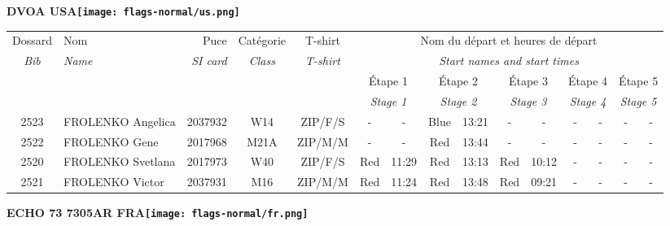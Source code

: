 \documentclass{report}
\begin{document}
\newpage
  \Huge \centering \bfseries DVOA  USA\normalfont \footnotesize \sffamily \hfill \texttt{[image: flags-normal/us.png]} \newline 
  \begin{longtable}{|c|l|r|c|c|*{5}{cc|}}
    Dossard & Nom  & Puce    & Catégorie & T-shirt & \multicolumn{10}{c|}{Nom du départ et heures de départ} \\
    \itshape Bib     & \itshape Name & \itshape SI card & \itshape Class  & \itshape  T-shirt  & \multicolumn{10}{c|}{\itshape Start names and start times} \\
    \hline
    & & & & & \multicolumn{2}{c|}{Étape 1} & \multicolumn{2}{c|}{Étape 2} & \multicolumn{2}{c|}{Étape 3} & \multicolumn{2}{c|}{Étape 4} & \multicolumn{2}{c|}{Étape 5} \\
    & & & & & \multicolumn{2}{c|}{\itshape Stage 1} & \multicolumn{2}{c|}{\itshape Stage 2} & \multicolumn{2}{c|}{\itshape Stage 3} & \multicolumn{2}{c|}{\itshape Stage 4} & \multicolumn{2}{c|}{\itshape Stage 5} \\
    \hline
    2523 & FROLENKO Angelica & 2037932 & W14 & ZIP/F/S & - &  - & Blue & 13:21 & - &  - & - &  - & - &  -\\
    2522 & FROLENKO Gene & 2017968 & M21A & ZIP/M/M & - &  - & Red & 13:44 & - &  - & - &  - & - &  -\\
    2520 & FROLENKO Svetlana & 2017973 & W40 & ZIP/F/S & Red & 11:29 & Red & 13:13 & Red & 10:12 & - &  - & - &  -\\
    2521 & FROLENKO Victor & 2037931 & M16 & ZIP/M/M & Red & 11:24 & Red & 13:48 & Red & 09:21 & - &  - & - &  -\\
  \end{longtable}
\newpage
  \Huge \centering \bfseries ECHO 73 7305AR FRA\normalfont \footnotesize \sffamily \hfill \texttt{[image: flags-normal/fr.png]} \newline 
\end{document}
